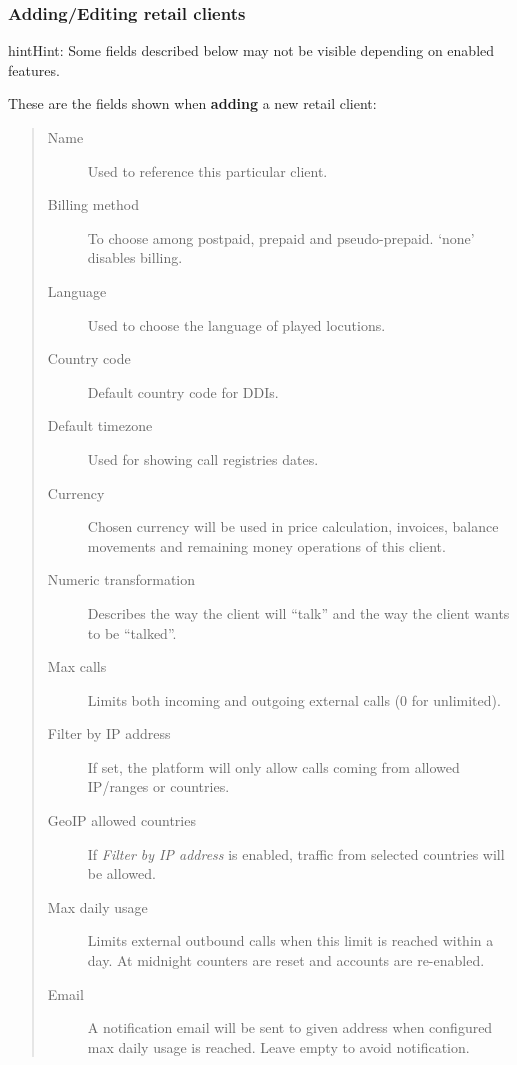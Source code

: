 \documentclass[letterpaper,10pt,english]{sphinxmanual}
\begin{document}
\subsubsection{Adding/Editing retail clients}
\label{administration_portal/brand/clients/retail:adding-editing-retail-clients}
\begin{notice}{hint}{Hint:}
Some fields described below may not be visible depending on enabled features.
\end{notice}

These are the fields shown when \textbf{adding} a new retail client:
\begin{quote}
\begin{description}
\item[{Name}] \leavevmode
Used to reference this particular client.

\item[{Billing method}] \leavevmode
To choose among postpaid, prepaid and pseudo-prepaid. `none' disables billing.

\item[{Language}] \leavevmode
Used to choose the language of played locutions.

\item[{Country code}] \leavevmode
Default country code for DDIs.

\item[{Default timezone}] \leavevmode
Used for showing call registries dates.

\item[{Currency}] \leavevmode
Chosen currency will be used in price calculation, invoices, balance movements and
remaining money operations of this client.

\item[{Numeric transformation}] \leavevmode
Describes the way the client will ``talk'' and the way the client wants to be ``talked''.

\item[{Max calls}] \leavevmode
Limits both incoming and outgoing external calls (0 for unlimited).

\item[{Filter by IP address}] \leavevmode
If set, the platform will only allow calls coming from allowed IP/ranges or countries.

\item[{GeoIP allowed countries}] \leavevmode
If \emph{Filter by IP address} is enabled, traffic from selected countries will be allowed.

\item[{Max daily usage}] \leavevmode
Limits external outbound calls when this limit is reached within a day. At midnight counters are reset and
accounts are re-enabled.

\item[{Email}] \leavevmode
A notification email will be sent to given address when configured max daily usage is reached. Leave empty to
avoid notification.

\end{description}
\end{quote}
\end{document}
